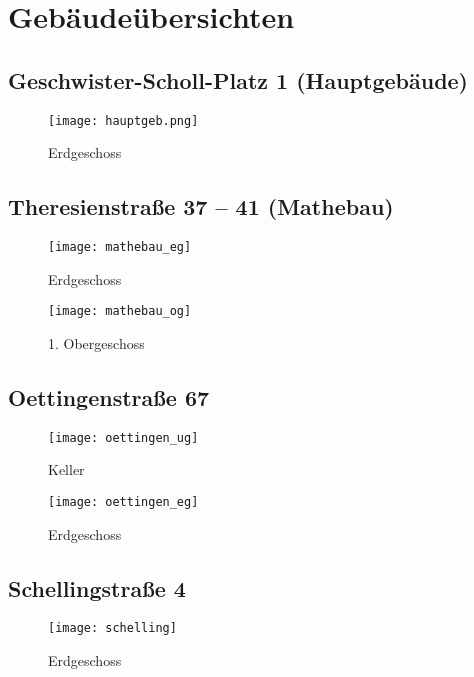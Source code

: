 ﻿
\chapter{Gebäudeübersichten}


\section*{Geschwister-Scholl-Platz 1 (Hauptgebäude)}
\begin{figure}[H]
	\centering
	\texttt{[image: hauptgeb.png]}
	\caption{Erdgeschoss}
\end{figure}

\section*{Theresienstraße 37 -- 41 (Mathebau)}
\begin{figure}[H]
	\centering%
	\begin{minipage}{.5\textwidth}
		\centering
		\texttt{[image: mathebau\_eg]}
		\caption{Erdgeschoss}
	\end{minipage}%
	\begin{minipage}{.5\textwidth}
		\centering
		\texttt{[image: mathebau\_og]}
		\caption{1. Obergeschoss}
	\end{minipage}
\end{figure}

\section*{Oettingenstraße 67\subjectList{\subjectI{}\subjectMI{}}}
\begin{figure}[H]
	\centering%
	\begin{minipage}{.5\textwidth}
		\centering
		\texttt{[image: oettingen\_ug]}
		\caption{Keller}
	\end{minipage}%
	\begin{minipage}{.5\textwidth}
		\centering
		\texttt{[image: oettingen\_eg]}
		\caption{Erdgeschoss}
	\end{minipage}
\end{figure}

\section*{Schellingstraße 4\subjectList{\subjectP{}}}
\begin{figure}[H]
	\centering
	\texttt{[image: schelling]}
	\caption{Erdgeschoss}
\end{figure}
